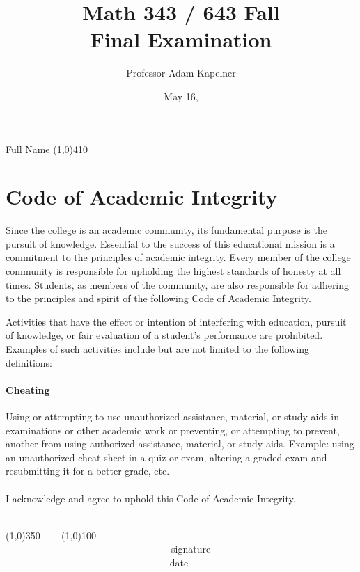 \documentclass[12pt]{article}
\title{Math 343 / 643 Fall \the\year{} \\ Final Examination \inred{Solutions}}
\author{Professor Adam Kapelner}
\date{May 16, \the\year{}}
\begin{document}
\maketitle

\noindent Full Name \line(1,0){410}

\thispagestyle{empty}

\section*{Code of Academic Integrity}

\footnotesize
Since the college is an academic community, its fundamental purpose is the pursuit of knowledge. Essential to the success of this educational mission is a commitment to the principles of academic integrity. Every member of the college community is responsible for upholding the highest standards of honesty at all times. Students, as members of the community, are also responsible for adhering to the principles and spirit of the following Code of Academic Integrity.

Activities that have the effect or intention of interfering with education, pursuit of knowledge, or fair evaluation of a student's performance are prohibited. Examples of such activities include but are not limited to the following definitions:

\paragraph{Cheating} Using or attempting to use unauthorized assistance, material, or study aids in examinations or other academic work or preventing, or attempting to prevent, another from using authorized assistance, material, or study aids. Example: using an unauthorized cheat sheet in a quiz or exam, altering a graded exam and resubmitting it for a better grade, etc.\\
\\
\noindent I acknowledge and agree to uphold this Code of Academic Integrity. \\~\\

\begin{center}
\line(1,0){350} ~~~ \line(1,0){100}\\
~~~~~~~~~~~~~~~~~~~~~~~~~~~~~~~~~~signature~~~~~~~~~~~~~~~~~~~~~~~~~~~~~~~~~~~~~~~~~~~~~~~~~~~~~~~~~~~~~~ date
\end{center}

\normalsize
\end{document}
